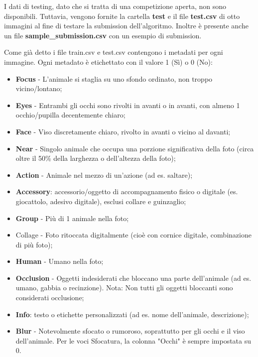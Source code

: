     I dati di testing, dato che si tratta di una competizione aperta, non sono disponibili. Tuttavia, vengono fornite la cartella \textbf{test} e il file \textbf{test.csv} di otto immagini al fine di testare la submission dell'algoritmo.
    Inoltre è presente anche un file \textbf{sample\_submission.csv} con un esempio di submission.

    Come già detto i file train.csv e test.csv contengono i metadati per ogni immagine. Ogni metadato è etichettato con il valore 1 (Sì) o 0 (No):
        
    \begin{itemize}
        \item \textbf{Focus} - L'animale si staglia su uno sfondo ordinato, non troppo vicino/lontano;
        \item \textbf{Eyes} - Entrambi gli occhi sono rivolti in avanti o in avanti, con almeno 1 occhio/pupilla decentemente chiaro;
        \item \textbf{Face} - Viso discretamente chiaro, rivolto in avanti o vicino al davanti;
        \item \textbf{Near} - Singolo animale che occupa una porzione significativa della foto (circa oltre il 50\% della larghezza o dell'altezza della foto);
        \item \textbf{Action} - Animale nel mezzo di un'azione (ad es. saltare);
        \item \textbf{Accessory}: accessorio/oggetto di accompagnamento fisico o digitale (es. giocattolo, adesivo digitale), esclusi collare e guinzaglio;
        \item \textbf{Group} - Più di 1 animale nella foto;
        \item Collage - Foto ritoccata digitalmente (cioè con cornice digitale, combinazione di più foto);
        \item \textbf{Human} - Umano nella foto;
        \item \textbf{Occlusion} - Oggetti indesiderati che bloccano una parte dell'animale (ad es. umano, gabbia o recinzione). Nota: Non tutti gli oggetti bloccanti sono considerati occlusione;
        \item \textbf{Info}: testo o etichette personalizzati (ad es. nome dell'animale, descrizione);
        \item \textbf{Blur} - Notevolmente sfocato o rumoroso, soprattutto per gli occhi e il viso dell'animale. Per le voci Sfocatura, la colonna "Occhi" è sempre impostata su 0.
    \end{itemize}


